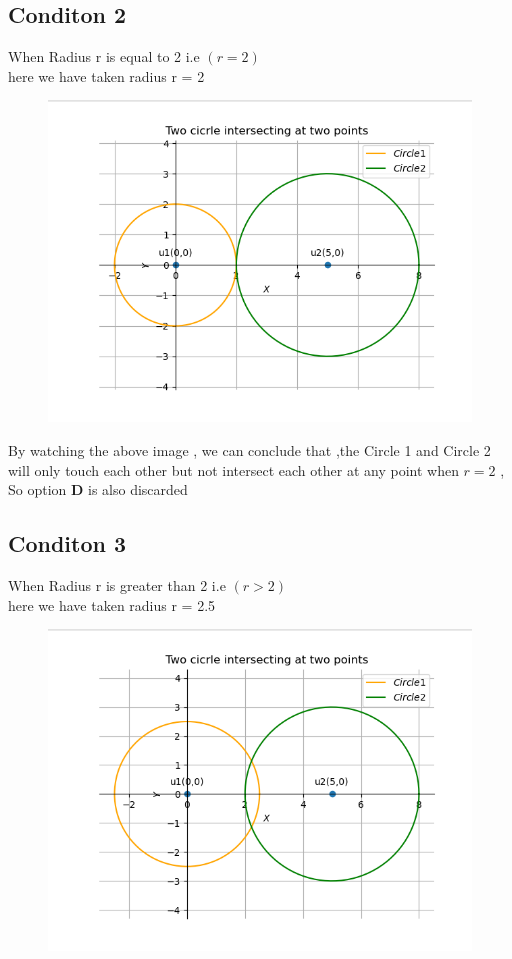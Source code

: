\documentclass[journal,12pt,twocolumn]{IEEEtran}
\begin{document}
\subsection{Conditon 2} When Radius r is equal to 2 i.e $(r=2)$\\
here we have taken radius r = 2
\begin{figure}[h]
    \centering
\includegraphics[width=\columnwidth]{circle2.png}
    \label{fig:my_label}
\end{figure}

By watching the above image , we can conclude that ,the  Circle 1 and Circle 2 will only touch each other but not intersect each other at any point when $r=2$ , So  option \textbf{D} is also discarded
\subsection{Conditon 3} When Radius r is greater than 2 i.e $(r>2)$\\
here we have taken radius r = 2.5
\begin{figure}[h]
    \centering
\includegraphics[width=\columnwidth]{circle3.png}
    \label{fig:my_label}
\end{figure}
\end{document}
